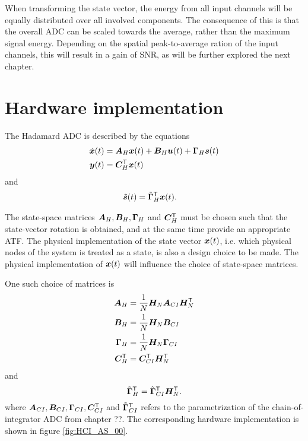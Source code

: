 When transforming the state vector, the energy from all input channels will be equally distributed over all involved components. The consequence of this is that the overall ADC can be scaled towards the average, rather than the maximum signal energy. Depending on the spatial peak-to-average ration of the input channels, this will result in a gain of SNR, as will be further explored the next chapter.

\section{Hardware implementation}
The Hadamard ADC is described by the equations
\begin{align}
    \dot{\bm{x}}(t) & = \bm{A}_H \bm{x}(t) + \bm{B}_H \bm{u}(t) + \bm{\Gamma}_H \bm{s}(t) \\
    \bm{y}(t) & = \bm{C}^\mathsf{T}_H \bm{x}(t)
\end{align}
and
\begin{align}
    \tilde{\bm{s}}(t) & = \tilde{\bm{\Gamma}}^\mathsf{T}_H \bm{x}(t).
\end{align}

The state-space matrices $\bm{A}_H, \bm{B}_H, \bm{\Gamma}_H$ and $\bm{C}^\mathsf{T}_H$ must be chosen such that the state-vector rotation is obtained, and at the same time provide an appropriate ATF. The physical implementation of the state vector $\bm{x}(t)$, i.e. which physical nodes of the system is treated as a state, is also a design choice to be made. The physical implementation of $\bm{x}(t)$ will influence the choice of state-space matrices.

One such choice of matrices is
\begin{align}
    \bm{A}_H & = \frac{1}{N}\bm{H_}{N}\bm{A}_{CI}\bm{H_}{N}^\mathsf{T} \\
    \bm{B}_H & = \frac{1}{N}\bm{H_}{N}\bm{B}_{CI} \\
    \bm{\Gamma}_H & = \frac{1}{N}\bm{H_}{N}\bm{\Gamma}_{CI} \\
    \bm{C}^\mathsf{T}_H & = \bm{C}^\mathsf{T}_{CI} \bm{H_}{N}^\mathsf{T}
\end{align}
and
\begin{equation}
    \tilde{\bm{\Gamma}}^\mathsf{T}_H = \tilde{\bm{\Gamma}}^\mathsf{T}_{CI} \bm{H_}{N}^\mathsf{T}.
\end{equation}
where  $\bm{A}_{CI}, \bm{B}_{CI}, \bm{\Gamma}_{CI}, \bm{C}^\mathsf{T}_{CI}$ and $\tilde{\bm{\Gamma}}^\mathsf{T}_{CI}$ refers to the parametrization of the chain-of-integrator ADC from chapter ??. The corresponding hardware implementation is shown in figure \ref{fig:HCI_AS_00}.

